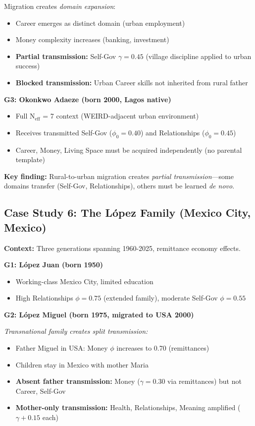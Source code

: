 Migration creates \textit{domain expansion}:
\begin{itemize}[nosep]
\item Career emerges as distinct domain (urban employment)
\item Money complexity increases (banking, investment)
\item \textbf{Partial transmission:} Self-Gov $\gamma = 0.45$ (village discipline applied to urban success)
\item \textbf{Blocked transmission:} Urban Career skills not inherited from rural father
\end{itemize}

\textbf{G3: Okonkwo Adaeze (born 2000, Lagos native)}
\begin{itemize}[nosep]
\item Full N$_{\text{eff}}$ = 7 context (WEIRD-adjacent urban environment)
\item Receives transmitted Self-Gov ($\phi_0 = 0.40$) and Relationships ($\phi_0 = 0.45$)
\item Career, Money, Living Space must be acquired independently (no parental template)
\end{itemize}

\textbf{Key finding:} Rural-to-urban migration creates \textit{partial transmission}---some domains
transfer (Self-Gov, Relationships), others must be learned \textit{de novo}.

\subsection{Case Study 6: The López Family (Mexico City, Mexico)}

\textbf{Context:} Three generations spanning 1960-2025, remittance economy effects.

\textbf{G1: López Juan (born 1950)}
\begin{itemize}[nosep]
\item Working-class Mexico City, limited education
\item High Relationships $\phi = 0.75$ (extended family), moderate Self-Gov $\phi = 0.55$
\end{itemize}

\textbf{G2: López Miguel (born 1975, migrated to USA 2000)}

\textit{Transnational family creates split transmission:}
\begin{itemize}[nosep]
\item Father Miguel in USA: Money $\phi$ increases to 0.70 (remittances)
\item Children stay in Mexico with mother Maria
\item \textbf{Absent father transmission:} Money ($\gamma = 0.30$ via remittances) but not Career, Self-Gov
\item \textbf{Mother-only transmission:} Health, Relationships, Meaning amplified ($\gamma + 0.15$ each)
\end{itemize}

